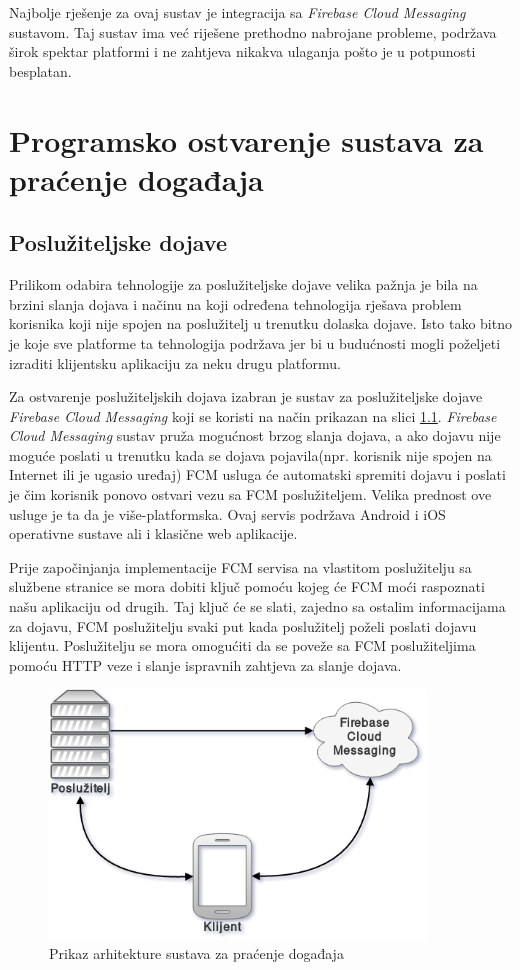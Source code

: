 \documentclass[times, utf8, zavrsni]{fer}
\begin{document}
{Najbolje rješenje za ovaj sustav je integracija sa {\em Firebase Cloud Messaging} sustavom. Taj sustav ima već riješene prethodno nabrojane probleme, podržava širok spektar platformi i ne zahtjeva nikakva ulaganja pošto je u potpunosti besplatan.

\chapter{Programsko ostvarenje sustava za praćenje događaja}
\label{chp:implementation}

\section{Poslužiteljske dojave}
Prilikom odabira tehnologije za poslužiteljske dojave velika pažnja je bila na brzini slanja dojava i načinu na koji određena tehnologija rješava problem korisnika koji nije spojen na poslužitelj u trenutku dolaska dojave. Isto tako bitno je koje sve platforme ta tehnologija podržava jer bi u budućnosti mogli poželjeti izraditi klijentsku aplikaciju za neku drugu platformu.

Za ostvarenje poslužiteljskih dojava izabran je sustav za poslužiteljske dojave {\em Firebase Cloud Messaging} koji se koristi na način prikazan na slici \ref{fig:architecture-image}. {\em Firebase Cloud Messaging} sustav pruža mogućnost brzog slanja dojava, a ako dojavu nije moguće poslati u trenutku kada se dojava pojavila(npr. korisnik nije spojen na Internet ili je ugasio uređaj) FCM usluga će automatski spremiti dojavu i poslati je čim korisnik ponovo ostvari vezu sa FCM poslužiteljem. Velika prednost ove usluge je ta da je više-platformska. Ovaj servis podržava Android i iOS operativne sustave ali i klasične web aplikacije.

Prije započinjanja implementacije FCM servisa na vlastitom poslužitelju sa službene stranice se mora dobiti ključ pomoću kojeg će FCM moći raspoznati našu aplikaciju od drugih. Taj ključ će se slati, zajedno sa ostalim informacijama za dojavu, FCM poslužitelju svaki put kada poslužitelj poželi poslati dojavu klijentu. Poslužitelju se mora omogućiti da se poveže sa FCM poslužiteljima pomoću HTTP veze i slanje ispravnih zahtjeva za slanje dojava.

\begin{figure}[htb]
\centering
\includegraphics[width=10cm]{img/architecture.png}
\caption{Prikaz arhitekture sustava za praćenje događaja}
\label{fig:architecture-image}
\end{figure}

}
\end{document}
